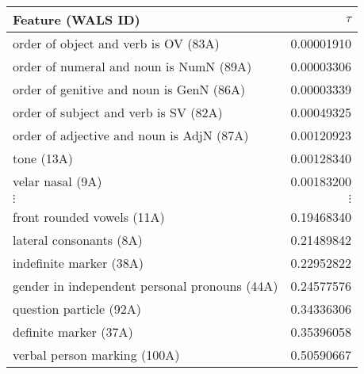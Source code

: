 \begin{tabular}{lr}
Feature (WALS ID) & $\tau$ \\
\hline
order of object and verb is OV (83A)&0.00001910\\
order of numeral and noun is NumN (89A)&0.00003306\\
order of genitive and noun is GenN (86A)&0.00003339\\
order of subject and verb is SV (82A)&0.00049325\\
order of adjective and noun is AdjN (87A)&0.00120923\\
tone (13A)&0.00128340\\
velar nasal (9A)&0.00183200\\
$\vdots$ & $\vdots$ \\
front rounded vowels (11A)&0.19468340\\
lateral consonants (8A)&0.21489842\\
indefinite marker (38A)&0.22952822\\
gender in independent personal pronouns (44A)&0.24577576\\
question particle (92A)&0.34336306\\
definite marker (37A)&0.35396058\\
verbal person marking (100A)&0.50590667\\
\hline
\end{tabular}
